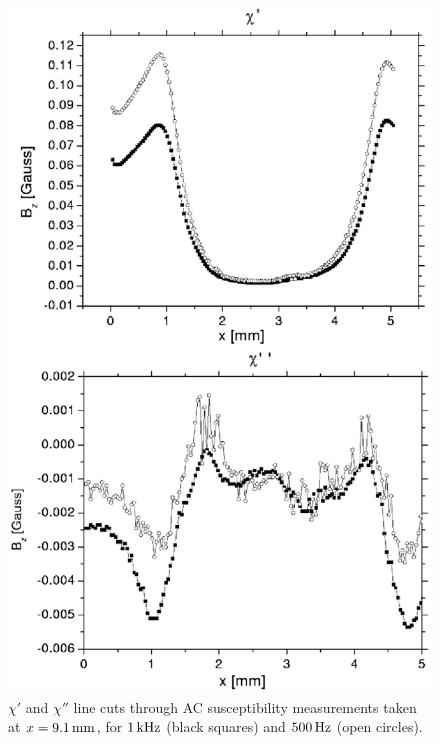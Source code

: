 %
%
\begin{figure}[p]
\includegraphics[width=5.7in]{figs/magpen/ac.ps}
\caption[$\chi'$ and $\chi''$ line cuts through AC 
susceptibility measurements.]
{$\chi'$  and $\chi''$ 
line cuts through AC susceptibility measurements taken at 
$x=9.1\,\mathrm{mm}$, for $1\,\mathrm{kHz}$ (black squares) and
$500\,\mathrm{Hz}$ (open circles).
}
\label{fig:rabits_ac_line_cuts_a}
\label{fig:rabits_ac_line_cuts_b}
\end{figure}

%

